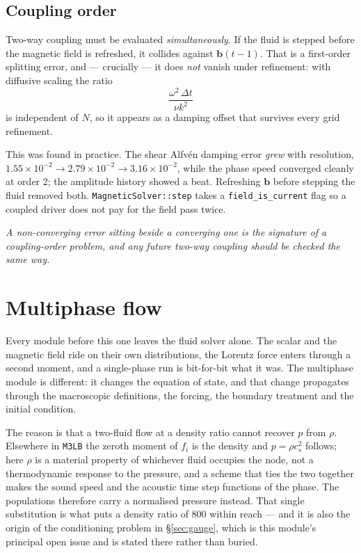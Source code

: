\documentclass[11pt,a4paper]{article}
\newcommand{\code}[1]{\texttt{\small #1}}
\newcommand{\cs}{c_s}
\newcommand{\bb}{\bm{b}}
\begin{document}
\subsection{Coupling order}
\label{sec:couplingorder}

Two-way coupling must be evaluated \emph{simultaneously}. If the fluid is stepped
before the magnetic field is refreshed, it collides against $\bb(t-1)$. That is a
first-order splitting error, and --- crucially --- it does \emph{not} vanish under
refinement: with diffusive scaling the ratio
\begin{equation}
  \frac{\omega^2\,\Delta t}{\nu k^2}
\end{equation}
is independent of $N$, so it appears as a damping offset that survives every
grid refinement.

This was found in practice. The shear Alfv\'en damping error \emph{grew} with
resolution, $1.55\times10^{-2}\to2.79\times10^{-2}\to3.16\times10^{-2}$, while the
phase speed converged cleanly at order 2; the amplitude history showed a beat.
Refreshing $\bb$ before stepping the fluid removed both. \code{MagneticSolver::step}
takes a \code{field\_is\_current} flag so a coupled driver does not pay for the
field pass twice.

\medskip
\noindent\emph{A non-converging error sitting beside a converging one is the
signature of a coupling-order problem, and any future two-way coupling should be
checked the same way.}

\section{Multiphase flow}
\label{sec:multiphase}

Every module before this one leaves the fluid solver alone. The scalar and the
magnetic field ride on their own distributions, the Lorentz force enters through
a second moment, and a single-phase run is bit-for-bit what it was. The
multiphase module is different: it changes the equation of state, and that change
propagates through the macroscopic definitions, the forcing, the boundary
treatment and the initial condition.

The reason is that a two-fluid flow at a density ratio cannot recover $p$ from
$\rho$. Elsewhere in \code{M3LB} the zeroth moment of $f_i$ is the density and
$p=\rho\cs^2$ follows; here $\rho$ is a material property of whichever fluid
occupies the node, not a thermodynamic response to the pressure, and a scheme
that ties the two together makes the sound speed and the acoustic time step
functions of the phase. The populations therefore carry a normalised pressure
instead. That single substitution is what puts a density ratio of $800$ within
reach --- and it is also the origin of the conditioning problem in
\S\ref{sec:gauge}, which is this module's principal open issue and is stated
there rather than buried.
\end{document}
